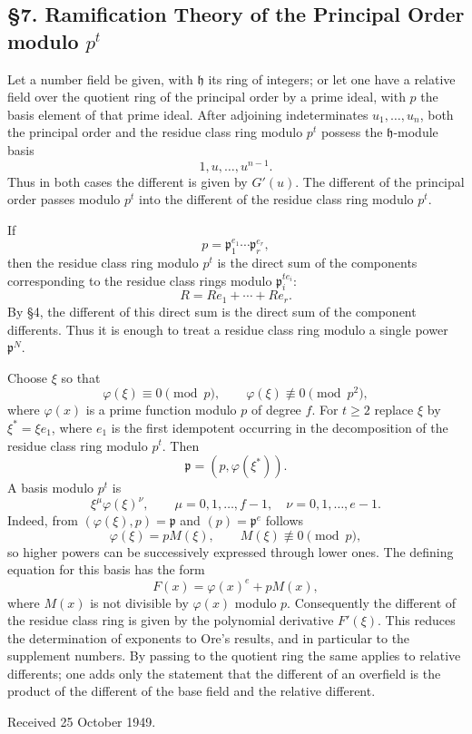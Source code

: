 \documentclass[11pt]{article}
\begin{document}
\subsection*{§7. Ramification Theory of the Principal Order modulo $p^t$}

Let a number field be given, with $\mathfrak h$ its ring of integers; or let one have a relative field over the quotient ring of the principal order by a prime ideal, with $p$ the basis element of that prime ideal. After adjoining indeterminates $u_1,\ldots,u_n$, both the principal order and the residue class ring modulo $p^t$ possess the $\mathfrak h$-module basis
\[
        1,u,\ldots,u^{n-1}.
\]
Thus in both cases the different is given by $G'(u)$. The different of the principal order passes modulo $p^t$ into the different of the residue class ring modulo $p^t$.

If
\[
        p=\mathfrak p_1^{e_1}\cdots\mathfrak p_r^{e_r},
\]
then the residue class ring modulo $p^t$ is the direct sum of the components corresponding to the residue class rings modulo $\mathfrak p_i^{te_i}$:
\[
        R=Re_1+\cdots+Re_r.
\]
By §4, the different of this direct sum is the direct sum of the component differents. Thus it is enough to treat a residue class ring modulo a single power $\mathfrak p^N$.

Choose $\xi$ so that
\[
        \varphi(\xi)\equiv0\pmod p,
        \qquad
        \varphi(\xi)\not\equiv0\pmod {p^2},
\]
where $\varphi(x)$ is a prime function modulo $p$ of degree $f$. For $t\ge2$ replace $\xi$ by $\xi^*=\xi e_1$, where $e_1$ is the first idempotent occurring in the decomposition of the residue class ring modulo $p^t$. Then
\[
        \mathfrak p=(p,\varphi(\xi^*)).
\]
A basis modulo $p^t$ is
\[
        \xi^{\mu}\varphi(\xi)^{\nu},
        \qquad
        \mu=0,1,\ldots,f-1,
        \quad
        \nu=0,1,\ldots,e-1.
\]
Indeed, from $(\varphi(\xi),p)=\mathfrak p$ and $(p)=\mathfrak p^e$ follows
\[
        \varphi(\xi)=pM(\xi),
        \qquad M(\xi)\not\equiv0\pmod p,
\]
so higher powers can be successively expressed through lower ones. The defining equation for this basis has the form
\[
        F(x)=\varphi(x)^e+pM(x),
\]
where $M(x)$ is not divisible by $\varphi(x)$ modulo $p$. Consequently the different of the residue class ring is given by the polynomial derivative $F'(\xi)$. This reduces the determination of exponents to Ore's results, and in particular to the supplement numbers. By passing to the quotient ring the same applies to relative differents; one adds only the statement that the different of an overfield is the product of the different of the base field and the relative different.

\begin{center}
Received 25 October 1949.
\end{center}
\end{document}
